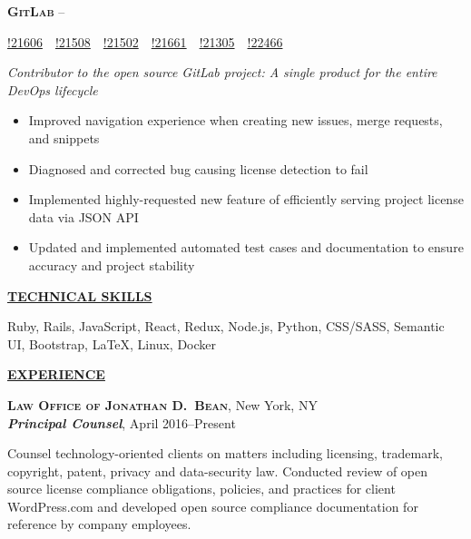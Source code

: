 \documentclass[11pt,letterpaper,english]{article}
\newenvironment{resumelist}[1]
{\begin{list}{}
{\setlength\itemsep{0pt}
\setlength\topsep{0pt}
\setlength\parskip{0pt}
\setlength\parsep{0pt}
\settowidth{\labelwidth}{#1}
 \setlength{\leftmargin}{\labelwidth}
 \addtolength{\leftmargin}{\labelsep}
 \renewcommand{\makelabel}[1]{##1\hfil}}}
{\end{list}}
\begin{document}
\textbf{\textsc{GitLab}} 
--\begin{small}
\href{https://gitlab.com/gitlab-org/gitlab-ce/merge_requests/21606}{!21606}~\color{darkgray}{|}~\href{https://gitlab.com/gitlab-org/gitlab-ce/merge_requests/21508}{!21508}~\color{darkgray}{|}~\href{https://gitlab.com/gitlab-org/gitlab-ce/merge_requests/21502}{!21502}~\color{darkgray}{|}~\href{https://gitlab.com/gitlab-org/gitlab-ce/merge_requests/21661}{!21661}~\color{darkgray}{|}~\href{https://gitlab.com/gitlab-org/gitlab-ce/merge_requests/21305}{!21305}~\color{darkgray}{|}~\href{https://gitlab.com/gitlab-org/gitlab-ce/merge_requests/22466}{!22466}\\
\end{small}
\textit{Contributor to the open source GitLab project: A single product for the entire DevOps lifecycle}
\begin{itemize}
\item Improved navigation experience when creating new issues, merge requests, and snippets
\item Diagnosed and corrected bug causing license detection to fail
\item Implemented highly-requested new feature of efficiently serving project license data via JSON API
\item Updated and implemented automated test cases and documentation to ensure accuracy and project stability
\end{itemize}
\bigskip

\label{Skills}
\underline{\textbf{\textsc{\large TECHNICAL SKILLS}}}{\large \par}
\smallskip
Ruby, Rails, JavaScript, React, Redux, Node.js, Python, CSS/SASS, Semantic UI, Bootstrap, \LaTeX, Linux, Docker
\bigskip


\label{Experience}
\underline{\textbf{\textsc{\large EXPERIENCE}}}{\large \par}
\smallskip

\textbf{\textsc{Law Office of Jonathan D.\ Bean}}, New York, NY\\\nopagebreak
\textbf{\textit{Principal Counsel}}, April 2016--Present%
\begin{resumelist}{M}
\item    
Counsel technology-oriented clients on matters including licensing, trademark, copyright, patent, privacy and data-security law. Conducted review of open source license compliance obligations, policies, and practices for client WordPress.com and developed open source compliance documentation for reference by company employees.
\end{resumelist}
\smallskip
\end{document}
